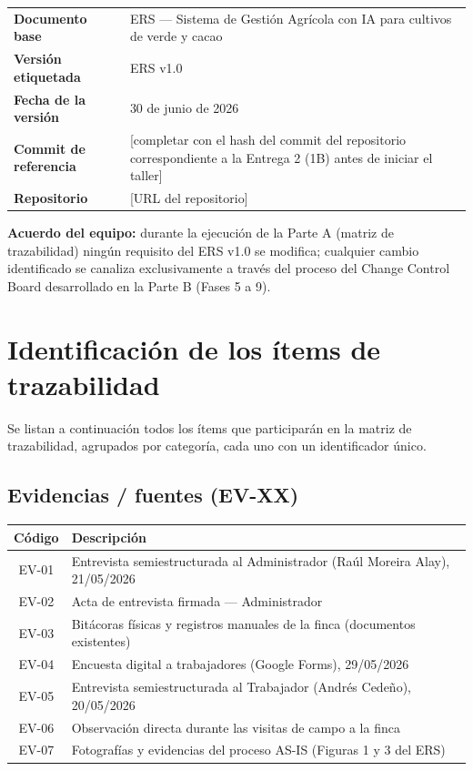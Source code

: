 \documentclass[12pt,a4paper]{article}
\begin{document}
\begin{table}[H]
\centering
\begin{tabular}{@{}ll@{}}
\toprule
\textbf{Documento base} & ERS --- Sistema de Gestión Agrícola con IA para cultivos de verde y cacao \\
\textbf{Versión etiquetada} & ERS v1.0 \\
\textbf{Fecha de la versión} & 30 de junio de 2026 \\
\textbf{Commit de referencia} & [completar con el hash del commit del repositorio correspondiente a la Entrega 2 (1B) antes de iniciar el taller] \\
\textbf{Repositorio} & [URL del repositorio] \\
\bottomrule
\end{tabular}
\end{table}

\textbf{Acuerdo del equipo:} durante la ejecución de la Parte A (matriz de trazabilidad) ningún requisito del ERS v1.0 se modifica; cualquier cambio identificado se canaliza exclusivamente a través del proceso del Change Control Board desarrollado en la Parte B (Fases 5 a 9).

\section{ Identificación de los ítems de trazabilidad }

Se listan a continuación todos los ítems que participarán en la matriz de trazabilidad, agrupados por categoría, cada uno con un identificador único.

\subsection{Evidencias / fuentes (EV-XX)}

\begin{longtable}{@{}cl@{}}
\toprule
\textbf{Código} & \textbf{Descripción} \\
\midrule
\endhead
EV-01 & Entrevista semiestructurada al Administrador (Raúl Moreira Alay), 21/05/2026 \\
EV-02 & Acta de entrevista firmada --- Administrador \\
EV-03 & Bitácoras físicas y registros manuales de la finca (documentos existentes) \\
EV-04 & Encuesta digital a trabajadores (Google Forms), 29/05/2026 \\
EV-05 & Entrevista semiestructurada al Trabajador (Andrés Cedeño), 20/05/2026 \\
EV-06 & Observación directa durante las visitas de campo a la finca \\
EV-07 & Fotografías y evidencias del proceso AS-IS (Figuras 1 y 3 del ERS) \\
\bottomrule
\end{longtable}
\end{document}
